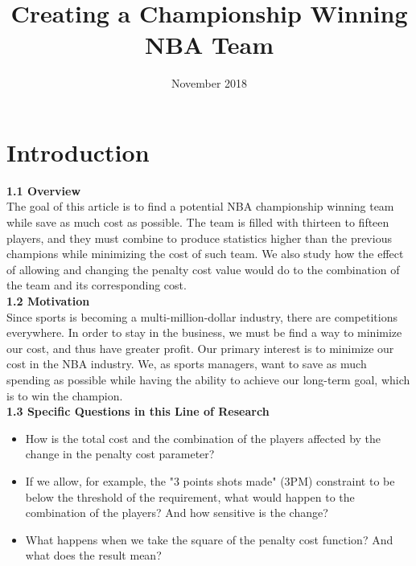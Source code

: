 \documentclass{article}
\title{Creating a Championship Winning NBA Team}
\author{}
\date{November 2018}
\begin{document}
\maketitle


\section{\centering Introduction}



\textbf{1.1 Overview}
\\

The goal of this article is to find a potential NBA championship winning team while save as much cost as possible. The team is filled with thirteen to fifteen players, and they must combine to produce statistics higher than the previous champions while minimizing the cost of such team. We also study how the effect of allowing and changing the penalty cost value would do to the combination of the team and its corresponding cost.\\
\newline
\textbf{1.2	Motivation }
\\

Since sports is becoming a multi-million-dollar industry, there are competitions everywhere. In order to stay in the business, we must be find a way to minimize our cost, and thus have greater profit. Our primary interest is to minimize our cost in the NBA industry. We, as sports managers, want to save as much spending as possible while having the ability to achieve our long-term goal, which is to win the champion. \\
\newline
\textbf{1.3	Specific Questions in this Line of Research} \\

\begin{itemize}
\item  How is the total cost and the combination of the players affected by the change in the penalty cost parameter? 
\item If we allow, for example, the "3 points shots made" (3PM) constraint to be below the threshold of the requirement, what would happen to the combination of the players? And how sensitive is the change? 
\item What happens when we take the square of the penalty cost function? And what does the result mean? 
\end{itemize}
\\
\end{document}
